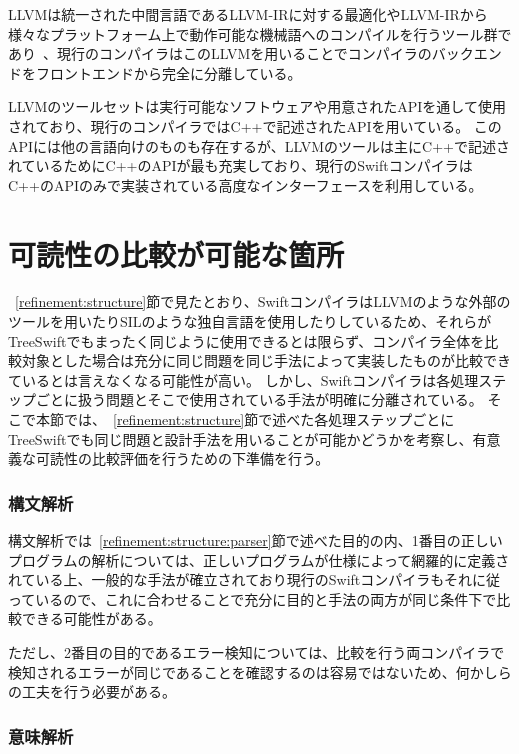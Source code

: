 LLVMは統一された中間言語であるLLVM-IRに対する最適化やLLVM-IRから様々なプラットフォーム上で動作可能な機械語へのコンパイルを行うツール群であり~\cite{llvm}、現行のコンパイラはこのLLVMを用いることでコンパイラのバックエンドをフロントエンドから完全に分離している。

LLVMのツールセットは実行可能なソフトウェアや用意されたAPIを通して使用されており、現行のコンパイラではC++で記述されたAPIを用いている。
このAPIには他の言語向けのものも存在するが、LLVMのツールは主にC++で記述されているためにC++のAPIが最も充実しており、現行のSwiftコンパイラはC++のAPIのみで実装されている高度なインターフェースを利用している。


\section{可読性の比較が可能な箇所}
\label{refinement:comperable}

~\ref{refinement:structure}節で見たとおり、SwiftコンパイラはLLVMのような外部のツールを用いたりSILのような独自言語を使用したりしているため、それらがTreeSwiftでもまったく同じように使用できるとは限らず、コンパイラ全体を比較対象とした場合は充分に同じ問題を同じ手法によって実装したものが比較できているとは言えなくなる可能性が高い。
しかし、Swiftコンパイラは各処理ステップごとに扱う問題とそこで使用されている手法が明確に分離されている。
そこで本節では、~\ref{refinement:structure}節で述べた各処理ステップごとにTreeSwiftでも同じ問題と設計手法を用いることが可能かどうかを考察し、有意義な可読性の比較評価を行うための下準備を行う。

\subsubsection{構文解析}

構文解析では~\ref{refinement:structure:parser}節で述べた目的の内、1番目の正しいプログラムの解析については、正しいプログラムが仕様によって網羅的に定義されている上、一般的な手法が確立されており現行のSwiftコンパイラもそれに従っているので、これに合わせることで充分に目的と手法の両方が同じ条件下で比較できる可能性がある。

ただし、2番目の目的であるエラー検知については、比較を行う両コンパイラで検知されるエラーが同じであることを確認するのは容易ではないため、何かしらの工夫を行う必要がある。

\subsubsection{意味解析}

